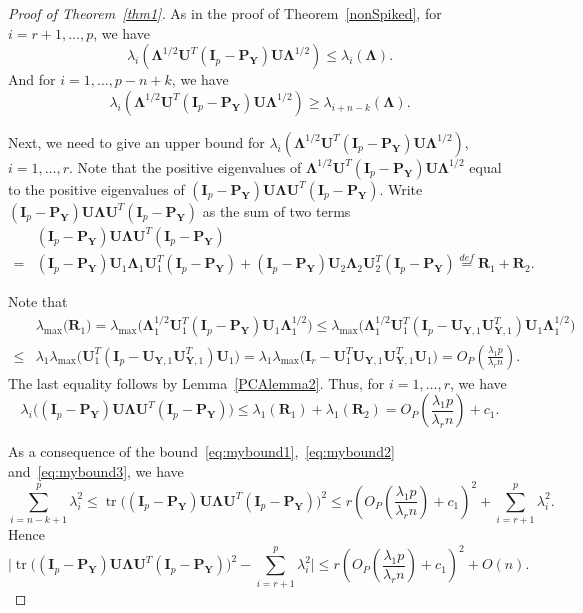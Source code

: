\documentclass[12pt]{article} %
\DeclareMathOperator{\mytr}{tr}
\newcommand{\bP}{\mathbf{P}}
\newcommand{\bY}{\mathbf{Y}}
\newcommand{\bR}{\mathbf{R}}
\newcommand{\bI}{\mathbf{I}}
\newcommand{\bU}{\mathbf{U}}
\newcommand{\bfsym}[1]{\ensuremath{\boldsymbol{#1}}}
\def\bLambda {\bfsym {\Lambda}}
\theoremstyle{definition}
\begin{document}
\begin{proof}[\textrm{Proof of Theorem~\ref{thm1}}]
    As in the proof of Theorem~\ref{nonSpiked}, for $i=r+1,\ldots, p$, we have
    \begin{equation}\label{eq:mybound1}
    \lambda_i (\bLambda^{1/2}\bU^T (\bI_p-\bP_{\bY})\bU\bLambda^{1/2})\leq
    \lambda_i (\bLambda).
    \end{equation}
     And for $i=1,\ldots, p-n+k$, we have
    \begin{equation}\label{eq:mybound2}
    \lambda_i (\bLambda^{1/2}\bU^T (\bI_p-\bP_{\bY})\bU\bLambda^{1/2})\geq
    \lambda_{i+n-k} (\bLambda).
    \end{equation}

    Next, we need to give an upper bound for $\lambda_i(\bLambda^{1/2}\bU^T (\bI_p-\bP_{\bY})\bU\bLambda^{1/2})$, $i=1,\ldots,r$.
    Note that the positive eigenvalues of $\bLambda^{1/2}\bU^T (\bI_p-\bP_{\bY})\bU\bLambda^{1/2}$  equal to the positive eigenvalues of $(\bI_p-\bP_{\bY})\bU\bLambda \bU^T (\bI_p-\bP_{\bY})$.
Write $(\bI_p-\bP_{\bY})\bU\bLambda \bU^T (\bI_p-\bP_{\bY})$ as the sum of two terms
$$
\begin{aligned}
&(\bI_p-\bP_{\bY})\bU\bLambda \bU^T (\bI_p-\bP_{\bY})
\\
=&
(\bI_p-\bP_{\bY})\bU_1\bLambda_1 \bU_1^T(\bI_p-\bP_{\bY})+(\bI_p-\bP_{\bY})\bU_2\bLambda_2 \bU_2^T (\bI_p-\bP_{\bY})
\overset{def}{=}\bR_1+\bR_2.
\end{aligned}
$$

Note that
$$
\begin{aligned}
&\lambda_{\max}\big( \bR_1 \big)
=
\lambda_{\max}\big(\bLambda_1^{1/2} \bU_1^T(\bI_p-\bP_{\bY}) \bU_1 \bLambda_1^{1/2}\big)
\leq 
\lambda_{\max}\big(\bLambda_1^{1/2} \bU_1^T(\bI_p-\bU_{\bY,1}\bU_{\bY,1}^T) \bU_1 \bLambda_1^{1/2}\big)\\
\leq &
\lambda_1
\lambda_{\max}\big(\bU_1^T(\bI_p-\bU_{\bY,1}\bU_{\bY,1}^T) \bU_1 \big)
= 
\lambda_1
\lambda_{\max}\big(\bI_r - \bU_1^T\bU_{\bY,1}\bU_{\bY,1}^T \bU_1 \big)=O_P(\frac{\lambda_1 p}{\lambda_r n}).
\end{aligned}
$$
    The last equality follows by Lemma~\ref{PCAlemma2}.
Thus, for $i=1,\ldots, r$, we have
    \begin{equation}\label{eq:mybound3}
\lambda_i\big((\bI_p-\bP_{\bY})\bU\bLambda \bU^T (\bI_p-\bP_{\bY})\big)\leq
\lambda_1(\bR_1)+\lambda_1(\bR_2)= O_P(\frac{\lambda_1 p}{\lambda_r n}) + c_1.
\end{equation}

    As a consequence of the bound~\eqref{eq:mybound1},~\eqref{eq:mybound2} and~\eqref{eq:mybound3}, we have
$$
    \sum_{i=n-k+1}^p \lambda_i^2\leq \mytr\big((\bI_p-\bP_{\bY})\bU\bLambda \bU^T (\bI_p-\bP_{\bY})\big)^2 \leq  r(O_P(\frac{\lambda_1 p}{\lambda_r n})+c_1)^2+\sum_{i=r+1}^p \lambda_i^2.
$$
    Hence
    \begin{equation}\label{eq:spiketrace1}
    \big|\mytr\big((\bI_p-\bP_{\bY})\bU\bLambda \bU^T (\bI_p-\bP_{\bY})\big)^2 - \sum_{i=r+1}^p \lambda_i^2 \big|\leq 
    r(O_P(\frac{\lambda_1 p}{\lambda_r n})+c_1)^2+O(n).
    \end{equation}


\end{proof}
\end{document}
